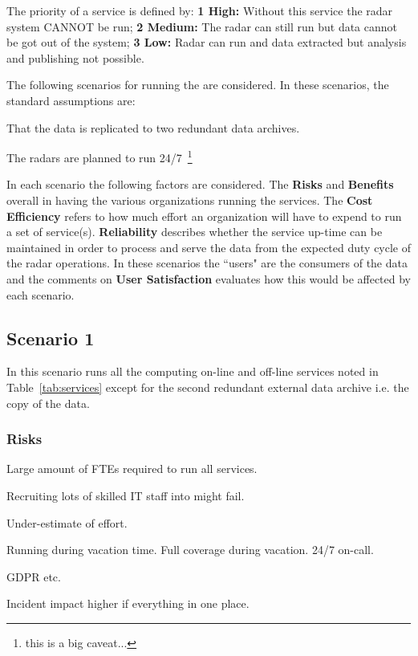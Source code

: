 \documentclass[12pt,a4paper]{article}
\begin{document}
The priority of a service is defined by: {\bf 1 High:} Without this service the radar system CANNOT be run; {\bf 2 Medium:} The radar can still run but data cannot be got out of the system; {\bf 3 Low:} Radar can run and data extracted but analysis and publishing not possible.

The following scenarios for running the \ED \einfra are considered.
In these scenarios, the standard assumptions are:
\bitm
\item That the \ED data is replicated to two redundant data archives.
\item The \ED radars are planned to run 24/7~\footnote{this is a big caveat...}
\eitm

In each scenario the following factors are considered.
The {\bf Risks} and {\bf Benefits} overall in having the various organizations running the services.
The {\bf Cost Efficiency} refers to how much effort an organization will have to expend to run a set of service(s).
{\bf Reliability} describes whether the service up-time can be maintained in order to process and serve the data from the expected duty cycle of the radar operations.
In these scenarios the ``users" are the consumers of the \ED data and the comments on {\bf User Satisfaction} evaluates how this would be affected by each scenario.

\subsection{Scenario 1}

In this scenario \EC runs all the computing on-line and off-line services noted in Table~\ref{tab:services} except for the second redundant external data archive i.e. the copy of the \ED data.

\subsubsection*{Risks}
\bitm
\item Large amount of FTEs required to run all services.
\item Recruiting lots of skilled IT staff into \ESA might fail.
\item Under-estimate of effort. 
\item Running during vacation time. Full coverage during vacation. 24/7 on-call.
\item GDPR etc.
\item Incident impact higher if everything in one place.
\eitm
\end{document}
